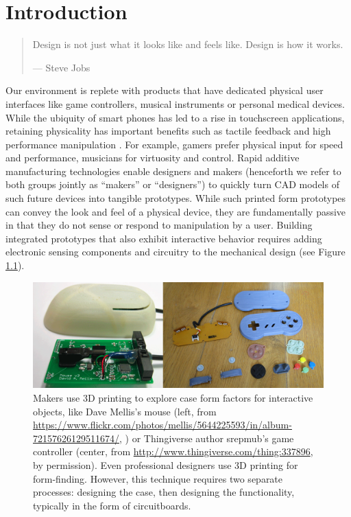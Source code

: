\chapter{Introduction}

\begin{quote}
Design is not just what it looks like and feels like. Design is how it works.

--- Steve Jobs
\end{quote}

Our environment is replete with products that have dedicated physical user interfaces like game controllers, musical instruments or personal medical devices. While the ubiquity of smart phones has led to a rise in touchscreen applications, retaining physicality has important benefits such as tactile feedback and high performance manipulation \cite{klemmer-bodies}. For example, gamers prefer physical input for speed and performance, musicians for virtuosity and control. Rapid additive manufacturing technologies enable designers and makers (henceforth we refer to both groups jointly as ``makers'' or ``designers'') to quickly turn CAD models of such future devices into tangible prototypes. While such printed form prototypes can convey the look and feel of a physical device, they are fundamentally passive in that they do not sense or respond to manipulation by a user. Building integrated prototypes that also exhibit interactive behavior requires adding electronic sensing components and circuitry to the mechanical design (see Figure \ref{fig:3dcases}).

\begin{figure}
\centering
\includegraphics[width=\textwidth]{figures/3dcases.png}
\caption{Makers use 3D printing to explore case form factors for interactive objects, like Dave Mellis's mouse (left, from \url{https://www.flickr.com/photos/mellis/5644225593/in/album-72157626129511674/}, \ccby) or Thingiverse author srepmub's game controller (center, from \url{http://www.thingiverse.com/thing:337896}, by permission). Even professional designers use 3D printing for form-finding. However, this technique requires two separate processes: designing the case, then designing the functionality, typically in the form of circuitboards.}
\label{fig:3dcases}
\end{figure}

